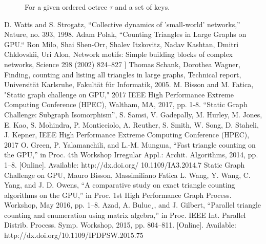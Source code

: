 \documentclass[conference]{IEEEtran}
\begin{document}
\begin{figure}
\caption{\label{fig:sfcSearch}\small For a given ordered octree $\tau$  and a set of keys.}
\end{figure}

\begin{thebibliography}{00}
 D. Watts and S. Strogatz, “Collective dynamics of ’small-world’ networks,” Nature, no. 393, 1998.
 Adam Polak, “Counting Triangles in Large Graphs on GPU.“
 Ron Milo, Shai Shen-Orr, Shalev Itzkovitz, Nadav Kashtan, Dmitri Chklovskii, Uri Alon, Network motifs: Simple building blocks of complex networks, Science 298 (2002) 824–827
 ] Thomas Schank, Dorothea Wagner, Finding, counting and listing all triangles in large graphs, Technical report, Universität Karlsruhe, Fakultät für Informatik, 2005.
 M. Bisson and M. Fatica, "Static graph challenge on GPU," 2017 IEEE High Performance Extreme Computing Conference (HPEC), Waltham, MA, 2017, pp. 1-8.
 “Static Graph Challenge: Subgraph Isomorphism”, S. Samsi, V. Gadepally, M. Hurley, M. Jones, E. Kao, S. Mohindra, P. Monticciolo, A. Reuther, S. Smith, W. Song, D. Staheli, J. Kepner, IEEE High Performance Extreme Computing Conference (HPEC), 2017
  O. Green, P. Yalamanchili, and L.-M. Munguıa, “Fast triangle counting on the GPU,” in Proc. 4th Workshop Irregular Appl.: Archit. Algorithms, 2014, pp. 1–8. [Online]. Available: http://dx.doi.org/ 10.1109/IA3.2014.7
 Static Graph Challenge on GPU, Mauro Bisson, Massimiliano Fatica
 L. Wang, Y. Wang, C. Yang, and J. D. Owens, “A comparative study on exact triangle counting algorithms on the GPU,” in Proc. 1st High Performance Graph Process. Workshop, May 2016, pp. 1–8.
 Azad, A. Buluc¸, and J. Gilbert, “Parallel triangle counting and enumeration using matrix algebra,” in Proc. IEEE Int. Parallel Distrib. Process. Symp. Workshop, 2015, pp. 804–811. [Online]. Available: http://dx.doi.org/10.1109/IPDPSW.2015.75

\end{thebibliography}
\end{document}

